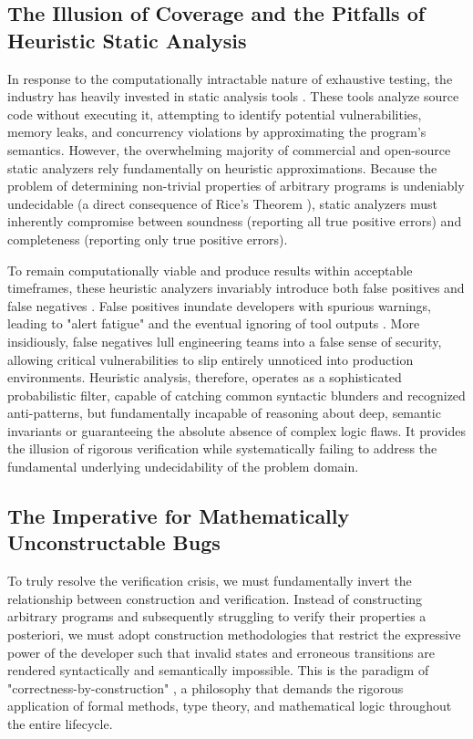 \subsection{The Illusion of Coverage and the Pitfalls of Heuristic Static Analysis}
In response to the computationally intractable nature of exhaustive testing, the industry has heavily invested in static analysis tools \cite{chess2004static}. These tools analyze source code without executing it, attempting to identify potential vulnerabilities, memory leaks, and concurrency violations by approximating the program's semantics. However, the overwhelming majority of commercial and open-source static analyzers rely fundamentally on heuristic approximations. Because the problem of determining non-trivial properties of arbitrary programs is undeniably undecidable (a direct consequence of Rice's Theorem \cite{rice1953classes}), static analyzers must inherently compromise between soundness (reporting all true positive errors) and completeness (reporting only true positive errors). 

To remain computationally viable and produce results within acceptable timeframes, these heuristic analyzers invariably introduce both false positives and false negatives \cite{bessey2010few}. False positives inundate developers with spurious warnings, leading to "alert fatigue" and the eventual ignoring of tool outputs \cite{johnson2013why}. More insidiously, false negatives lull engineering teams into a false sense of security, allowing critical vulnerabilities to slip entirely unnoticed into production environments. Heuristic analysis, therefore, operates as a sophisticated probabilistic filter, capable of catching common syntactic blunders and recognized anti-patterns, but fundamentally incapable of reasoning about deep, semantic invariants or guaranteeing the absolute absence of complex logic flaws. It provides the illusion of rigorous verification while systematically failing to address the fundamental underlying undecidability of the problem domain.

\subsection{The Imperative for Mathematically Unconstructable Bugs}
To truly resolve the verification crisis, we must fundamentally invert the relationship between construction and verification. Instead of constructing arbitrary programs and subsequently struggling to verify their properties a posteriori, we must adopt construction methodologies that restrict the expressive power of the developer such that invalid states and erroneous transitions are rendered syntactically and semantically impossible. This is the paradigm of "correctness-by-construction" \cite{hall1990seven}, a philosophy that demands the rigorous application of formal methods, type theory, and mathematical logic throughout the entire lifecycle.

